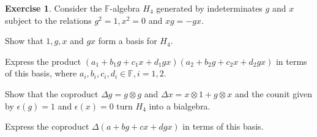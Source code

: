\documentclass{article}
\theoremstyle{definition}
\newtheorem{Exercise}{Exercise}
\theoremstyle{remark}
\theoremstyle{underline}
\theoremstyle{underline}
\begin{document}
	\begin{Exercise}
		Consider the $\mathbb F$-algebra $H_4$ generated by indeterminates $g$ and $x$ subject to the relations $g^2 = 1, x^2 = 0$ and $xg = -gx$.
		\begin{subquests}
			\item Show that $1, g, x$ and $gx$ form a basis for $H_4$.
			\item Express the product $(a_1 + b_1 g + c_1 x + d_1 gx)(a_2 + b_2 g + c_2 x + d_2 gx)$ in terms of this basis, where $a_i, b_i, c_i, d_i \in \mathbb F, i = 1, 2$.
			\item Show that the coproduct $\Delta g = g \otimes g$ and $\Delta x = x \otimes 1 + g \otimes x$ and the counit given by $\epsilon(g) = 1$ and $\epsilon(x) = 0$ turn $H_4$ into a bialgebra.
			\item Express the coproduct $\Delta(a + bg + cx + dgx)$ in terms of this basis.
		\end{subquests}
	\end{Exercise}
\end{document}
